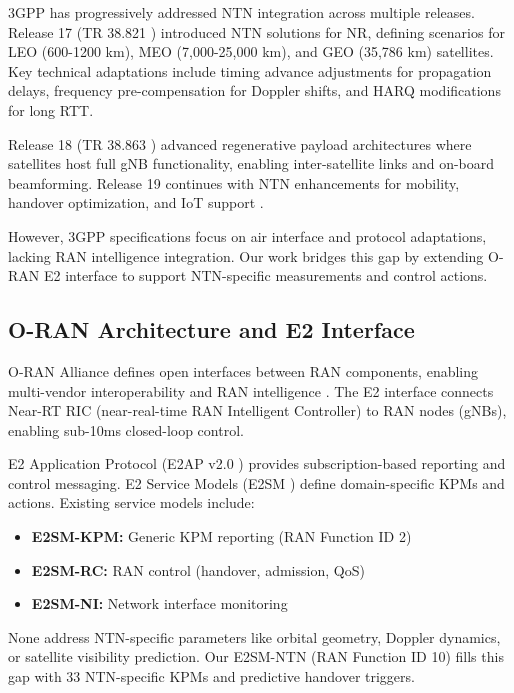 \documentclass[conference]{IEEEtran}
\begin{document}
3GPP has progressively addressed NTN integration across multiple releases. Release 17 (TR 38.821 \cite{3gpp_tr38821}) introduced NTN solutions for NR, defining scenarios for LEO (600-1200 km), MEO (7,000-25,000 km), and GEO (35,786 km) satellites. Key technical adaptations include timing advance adjustments for propagation delays, frequency pre-compensation for Doppler shifts, and HARQ modifications for long RTT.

Release 18 (TR 38.863 \cite{3gpp_tr38863}) advanced regenerative payload architectures where satellites host full gNB functionality, enabling inter-satellite links and on-board beamforming. Release 19 continues with NTN enhancements for mobility, handover optimization, and IoT support \cite{3gpp_rel19}.

However, 3GPP specifications focus on air interface and protocol adaptations, lacking RAN intelligence integration. Our work bridges this gap by extending O-RAN E2 interface to support NTN-specific measurements and control actions.

\subsection{O-RAN Architecture and E2 Interface}

O-RAN Alliance defines open interfaces between RAN components, enabling multi-vendor interoperability and RAN intelligence \cite{oran_architecture}. The E2 interface connects Near-RT RIC (near-real-time RAN Intelligent Controller) to RAN nodes (gNBs), enabling sub-10ms closed-loop control.

E2 Application Protocol (E2AP v2.0 \cite{oran_e2ap}) provides subscription-based reporting and control messaging. E2 Service Models (E2SM \cite{oran_e2sm}) define domain-specific KPMs and actions. Existing service models include:

\begin{itemize}
    \item \textbf{E2SM-KPM:} Generic KPM reporting (RAN Function ID 2)
    \item \textbf{E2SM-RC:} RAN control (handover, admission, QoS)
    \item \textbf{E2SM-NI:} Network interface monitoring
\end{itemize}

None address NTN-specific parameters like orbital geometry, Doppler dynamics, or satellite visibility prediction. Our E2SM-NTN (RAN Function ID 10) fills this gap with 33 NTN-specific KPMs and predictive handover triggers.
\end{document}

